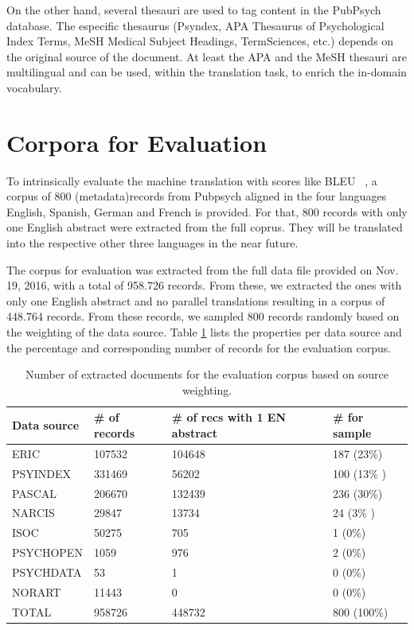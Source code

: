 \documentclass[a4paper,11pt]{article}
\begin{document}
On the other hand, several thesauri are used to tag content in the PubPsych database. The especific thesaurus (Psyndex, APA Thesaurus of Psychological Index Terms, MeSH Medical Subject Headings, TermSciences, etc.) depends on the original source of the document. At least the APA and the MeSH thesauri are multilingual and can be used, within the translation task, to enrich the in-domain vocabulary.

\section{Corpora for Evaluation}
\label{s:evaluation}
To intrinsically evaluate the machine translation with scores like BLEU ~\cite{papineni_bleu:_2002}, a corpus of 800 (metadata)records from Pubpsych aligned in the four languages English, Spanish, German and French is provided. For that, 800 records with only one English abstract were extracted from the full coprus. They will be translated into the respective other three languages in the near future. 

The corpus for evaluation was extracted from the full data file provided on Nov. 19, 2016, with a total of 958.726 records. From these, we extracted the ones with only one English abstract and no parallel translations resulting in a corpus of 448.764 records. From these records, we sampled 800 records randomly based on the weighting of the data source. Table \ref{tab:eval800} lists the properties per data source and the percentage and corresponding number of records for the evaluation corpus. 

\begin{small}
\begin{table}
\centering
\begin{tabular}{llll}
\toprule
Data source & \# of records & \# of recs with 1 EN abstract & \# for sample \\
\midrule
ERIC 		& 107532 		& 104648  & 187 (23\%) \\
PSYINDEX    & 331469        & 56202 & 100 (13\% )   \\
PASCAL      & 206670        & 132439 & 236 (30\%)           \\
NARCIS      & 29847         & 13734  & 24 (3\% )          \\
ISOC        & 50275         & 705  & 1 (0\%)         \\
PSYCHOPEN   & 1059          & 976    & 2  (0\%)           \\
PSYCHDATA   & 53            & 1  & 0  (0\%)           \\
NORART      & 11443         & 0  & 0 (0\%)             \\
\midrule
TOTAL  &  958726        & 448732   & 800 (100\%)\\
\bottomrule
\end{tabular}
\caption{Number of extracted documents for the evaluation corpus based on source weighting.}
\label{tab:eval800}
\end{table}
\end{small}
\end{document}
